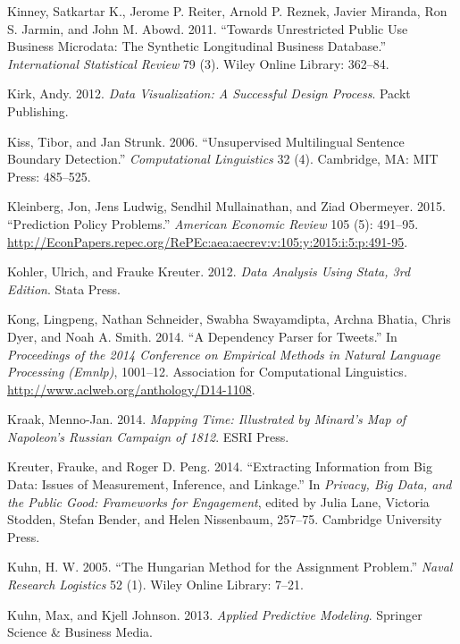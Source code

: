 \documentclass[]{krantz}
\begin{document}
\hypertarget{ref-kinney2011towards}{}
Kinney, Satkartar K., Jerome P. Reiter, Arnold P. Reznek, Javier
Miranda, Ron S. Jarmin, and John M. Abowd. 2011. ``Towards Unrestricted
Public Use Business Microdata: The Synthetic Longitudinal Business
Database.'' \emph{International Statistical Review} 79 (3). Wiley Online
Library: 362--84.

\hypertarget{ref-kirk2012data}{}
Kirk, Andy. 2012. \emph{Data Visualization: A Successful Design
Process}. Packt Publishing.

\hypertarget{ref-kiss-06}{}
Kiss, Tibor, and Jan Strunk. 2006. ``Unsupervised Multilingual Sentence
Boundary Detection.'' \emph{Computational Linguistics} 32 (4).
Cambridge, MA: MIT Press: 485--525.

\hypertarget{ref-Kleinberg2015}{}
Kleinberg, Jon, Jens Ludwig, Sendhil Mullainathan, and Ziad Obermeyer.
2015. ``Prediction Policy Problems.'' \emph{American Economic Review}
105 (5): 491--95.
\url{http://EconPapers.repec.org/RePEc:aea:aecrev:v:105:y:2015:i:5:p:491-95}.

\hypertarget{ref-kohler2012datenanalyse}{}
Kohler, Ulrich, and Frauke Kreuter. 2012. \emph{Data Analysis Using
Stata, 3rd Edition}. Stata Press.

\hypertarget{ref-kong-14}{}
Kong, Lingpeng, Nathan Schneider, Swabha Swayamdipta, Archna Bhatia,
Chris Dyer, and Noah A. Smith. 2014. ``A Dependency Parser for Tweets.''
In \emph{Proceedings of the 2014 Conference on Empirical Methods in
Natural Language Processing (Emnlp)}, 1001--12. Association for
Computational Linguistics.
\url{http://www.aclweb.org/anthology/D14-1108}.

\hypertarget{ref-Kraak2014}{}
Kraak, Menno-Jan. 2014. \emph{Mapping Time: Illustrated by Minard's Map
of Napoleon's Russian Campaign of 1812}. ESRI Press.

\hypertarget{ref-kreuter201412}{}
Kreuter, Frauke, and Roger D. Peng. 2014. ``Extracting Information from
Big Data: Issues of Measurement, Inference, and Linkage.'' In
\emph{Privacy, Big Data, and the Public Good: Frameworks for
Engagement}, edited by Julia Lane, Victoria Stodden, Stefan Bender, and
Helen Nissenbaum, 257--75. Cambridge University Press.

\hypertarget{ref-kuhn2005hungarian}{}
Kuhn, H. W. 2005. ``The Hungarian Method for the Assignment Problem.''
\emph{Naval Research Logistics} 52 (1). Wiley Online Library: 7--21.

\hypertarget{ref-KuhnJohnson2013}{}
Kuhn, Max, and Kjell Johnson. 2013. \emph{Applied Predictive Modeling}.
Springer Science \& Business Media.
\end{document}
